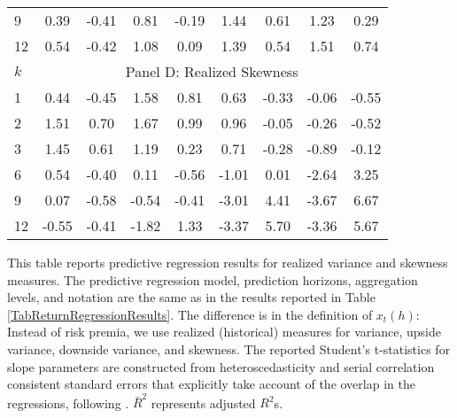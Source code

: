 \documentclass[11pt]{article}
\begin{document}
\begin{table}
\begin{center}
\begin{tabular}{lllllllll}
9 & \multicolumn{1}{c}{0.39} & \multicolumn{1}{c}{-0.41} & \multicolumn{1}{c}{0.81} & \multicolumn{1}{c}{-0.19} & \multicolumn{1}{c}{1.44} & \multicolumn{1}{c}{0.61} & \multicolumn{1}{c}{1.23} & \multicolumn{1}{c}{0.29} \\
12 & \multicolumn{1}{c}{0.54} & \multicolumn{1}{c}{-0.42} & \multicolumn{1}{c}{1.08} & \multicolumn{1}{c}{0.09} & \multicolumn{1}{c}{1.39} & \multicolumn{1}{c}{0.54} & \multicolumn{1}{c}{1.51} & \multicolumn{1}{c}{0.74} \\
\hline
$k$ & \multicolumn{8}{c}{Panel D: Realized Skewness} \\
\hline
1 & \multicolumn{1}{c}{0.44} & \multicolumn{1}{c}{-0.45} & \multicolumn{1}{c}{1.58} & \multicolumn{1}{c}{0.81} & \multicolumn{1}{c}{0.63} & \multicolumn{1}{c}{-0.33} & \multicolumn{1}{c}{-0.06} & \multicolumn{1}{c}{-0.55} \\
2 & \multicolumn{1}{c}{1.51} & \multicolumn{1}{c}{0.70} & \multicolumn{1}{c}{1.67} & \multicolumn{1}{c}{0.99} & \multicolumn{1}{c}{0.96} & \multicolumn{1}{c}{-0.05} & \multicolumn{1}{c}{-0.26} & \multicolumn{1}{c}{-0.52} \\
3 & \multicolumn{1}{c}{1.45} & \multicolumn{1}{c}{0.61} & \multicolumn{1}{c}{1.19} & \multicolumn{1}{c}{0.23} & \multicolumn{1}{c}{0.71} & \multicolumn{1}{c}{-0.28} & \multicolumn{1}{c}{-0.89} & \multicolumn{1}{c}{-0.12} \\
6 & \multicolumn{1}{c}{0.54} & \multicolumn{1}{c}{-0.40} & \multicolumn{1}{c}{0.11} & \multicolumn{1}{c}{-0.56} & \multicolumn{1}{c}{-1.01} & \multicolumn{1}{c}{0.01} & \multicolumn{1}{c}{-2.64} & \multicolumn{1}{c}{3.25} \\
9 & \multicolumn{1}{c}{0.07} & \multicolumn{1}{c}{-0.58} & \multicolumn{1}{c}{-0.54} & \multicolumn{1}{c}{-0.41} & \multicolumn{1}{c}{-3.01} & \multicolumn{1}{c}{4.41} & \multicolumn{1}{c}{-3.67} & \multicolumn{1}{c}{6.67} \\
12 & \multicolumn{1}{c}{-0.55} & \multicolumn{1}{c}{-0.41} & \multicolumn{1}{c}{-1.82} & \multicolumn{1}{c}{1.33} & \multicolumn{1}{c}{-3.37} & \multicolumn{1}{c}{5.70} & \multicolumn{1}{c}{-3.36} & \multicolumn{1}{c}{5.67} \\
\hline
\end{tabular}
  \end{center}
  \noindent\scriptsize This table reports predictive regression results for realized variance and skewness measures. The predictive regression model, prediction horizons, aggregation levels, and notation are the same as in the results reported in Table \ref{TabReturnRegressionResults}. The difference is in the definition of $x_t(h)$: Instead of risk premia, we use realized (historical) measures for variance, upside variance, downside variance, and skewness. The reported Student's t-statistics for slope parameters are constructed from heteroscedasticity and serial correlation consistent standard errors that explicitly take account of the overlap in the regressions, following \cite{Hodrick92RFS}. $\bar{R}^2$ represents adjusted $R^2$s.
\end{table}
\end{document}
